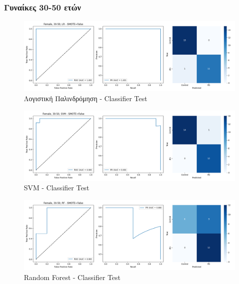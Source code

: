 \documentclass[12pt]{report}
\begin{document}
            \subsubsection*{Γυναίκες 30-50 ετών}
                \vspace{-0.5cm}
                \begin{figure}[H]
                    \centering
                    \includegraphics[width=1\textwidth]{ML/Predict/DEG/AUC/results_stratified_Female_30-50_LR_useSMOTE_False.png}
                    \caption*{Λογιστική Παλινδρόμηση - Classifier Test}
                    \label{fig:app_lr_females_30_50_test}
                \end{figure}
                \begin{figure}[H]
                    \centering
                    \includegraphics[width=1\textwidth]{ML/Predict/DEG/AUC/results_stratified_Female_30-50_SVM_useSMOTE_False.png}
                    \caption*{SVM - Classifier Test}
                    \label{fig:app_svm_females_30_50_test}
                \end{figure}
                \begin{figure}[H]
                    \centering
                    \includegraphics[width=1\textwidth]{ML/Predict/DEG/AUC/results_stratified_Female_30-50_RF_useSMOTE_False.png}
                    \caption*{Random Forest - Classifier Test}
                    \label{fig:app_rf_females_30_50_test}
                \end{figure}                
\end{document}
